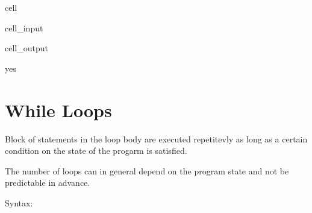 \documentclass[a4paper,10pt,english]{jupyterBook}
\begin{document}
\begin{sphinxuseclass}{cell}\begin{sphinxVerbatimInput}

\begin{sphinxuseclass}{cell_input}
\begin{sphinxVerbatim}[commandchars=\\\{\}]
\end{sphinxVerbatim}

\end{sphinxuseclass}\end{sphinxVerbatimInput}
\begin{sphinxVerbatimOutput}

\begin{sphinxuseclass}{cell_output}
\begin{sphinxVerbatim}[commandchars=\\\{\}]
yes
\end{sphinxVerbatim}

\end{sphinxuseclass}\end{sphinxVerbatimOutput}

\end{sphinxuseclass}
\sphinxstepscope


\section{While Loops}
\label{\detokenize{text/progtut/while:while-loops}}\label{\detokenize{text/progtut/while::doc}}
\sphinxAtStartPar
Block of statements in the loop body are executed repetitevly as long as a certain condition on the state of the progarm is satisfied.

\sphinxAtStartPar
The number of loops can in general depend on the program state and not be predictable in advance.

\sphinxAtStartPar
Syntax:

\begin{sphinxVerbatim}[commandchars=\\\{\}]
\end{sphinxVerbatim}
\end{document}
